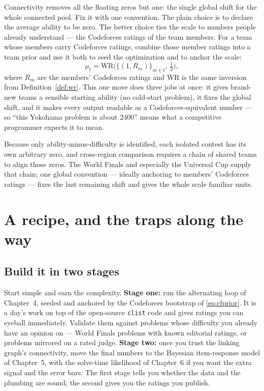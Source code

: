 \documentclass[11pt]{report}
\theoremstyle{definition}
\numberwithin{equation}{chapter}
\begin{document}
Connectivity removes all the floating zeros but one: the single global shift for
the whole connected pool. Fix it with one convention. The plain choice is to
declare the average ability to be zero. The better choice ties the scale to
numbers people already understand --- the Codeforces ratings of the team members.
For a team whose members carry Codeforces ratings, combine those member ratings
into a team prior and use it both to seed the optimization and to anchor the
scale:
\begin{equation}\label{eq:cfprior}
  \mu_t=\mathrm{WR}\big(\{(1,R_m)\}_{m\in t},\,\tfrac12\big),
\end{equation}
where $R_m$ are the members' Codeforces ratings and $\mathrm{WR}$ is the same
inversion from Definition~\ref{def:wr}. This one move does three jobs at once: it
gives brand-new teams a sensible starting ability (no cold-start problem), it
fixes the global shift, and it makes every output readable as a
Codeforces-equivalent number --- so ``this Yokohama problem is about $2400$''
means what a competitive programmer expects it to mean.

\begin{takeaway}
Because only ability-minus-difficulty is identified, each isolated contest has its
own arbitrary zero, and cross-region comparison requires a chain of shared teams
to align those zeros. The World Finals and especially the Universal Cup supply
that chain; one global convention --- ideally anchoring to members' Codeforces
ratings --- fixes the last remaining shift and gives the whole scale familiar
units.
\end{takeaway}

\chapter{A recipe, and the traps along the way}

\section{Build it in two stages}

Start simple and earn the complexity. \textbf{Stage one:} run the alternating
loop of Chapter~4, seeded and anchored by the Codeforces bootstrap of
\eqref{eq:cfprior}. It is a day's work on top of the open-source \texttt{clist}
code and gives ratings you can eyeball immediately. Validate them against
problems whose difficulty you already have an opinion on --- World Finals problems
with known editorial ratings, or problems mirrored on a rated judge. \textbf{Stage
two:} once you trust the linking graph's connectivity, move the final numbers to
the Bayesian item-response model of Chapter~5, with the solve-time likelihood of
Chapter~6 if you want the extra signal and the error bars. The first stage tells
you whether the data and the plumbing are sound; the second gives you the ratings
you publish.
\end{document}

